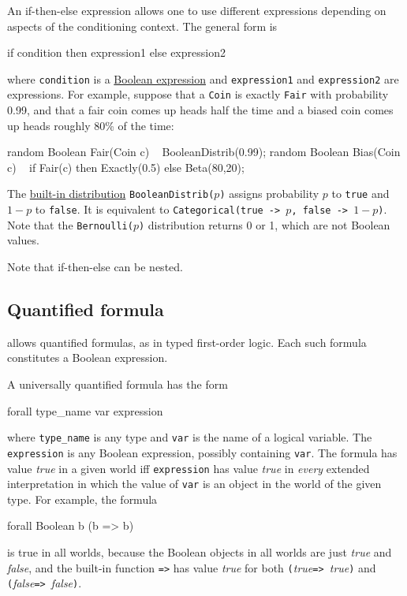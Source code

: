 \documentclass[12pt]{article}
\begin{document}
An if-then-else expression allows one to use different expressions depending on aspects of the conditioning context.
The general form is
\begin{blogcode}
if condition then expression1 else expression2
\end{blogcode}
where \texttt{condition} is a \hyperref[Boolean-expression-section]{Boolean expression} and \texttt{expression1} and \texttt{expression2}
are expressions. For example, suppose that a {\tt Coin} is exactly {\tt Fair} with probability 0.99, and that
a fair coin comes up heads half the time and a biased coin comes up heads roughly 80\% of the time:
\begin{blogcode}
random Boolean Fair(Coin c) ~ BooleanDistrib(0.99);
random Boolean Bias(Coin c) ~  
  if Fair(c) then Exactly(0.5) 
  else Beta(80,20);
\end{blogcode}
The \hyperref[builtin-distribution-appendix]{built-in distribution}
{\tt BooleanDistrib($p$)} assigns probability $p$ to {\tt true} and
$1-p$ to {\tt false}. It is equivalent to {\tt Categorical({true ->
    $p$, false -> $1-p$})}. Note that the {\tt Bernoulli($p$)}
distribution returns 0 or 1, which are not Boolean values. 

Note that if-then-else can be nested. 



\subsection{Quantified formula}\label{quantifier-section}
\bl allows quantified formulas, as in typed first-order logic. 
Each such formula constitutes a Boolean expression.

A universally quantified formula has the form
\begin{blogcode}
forall type_name var expression
\end{blogcode}
where {\tt type\_name} is any type and {\tt var} is the name of a
logical variable. The {\tt expression} is any Boolean expression,
possibly containing {\tt var}. The formula has value {\it true}
in a given world iff {\tt expression} has value {\it true}
in {\em every} extended interpretation in which the value of {\tt var} 
is an object in the world of the given type. For example, the formula
\begin{blogcode}
forall Boolean b (b => b)
\end{blogcode}
is true in all worlds, because the Boolean objects in all worlds are 
just {\it true} and {\it false}, and the built-in function {\tt =>}
has value {\it true} for both {\tt (}{\it true}{\tt => }{\it true}{\tt )}
and {\tt (}{\it false}{\tt => }{\it false}{\tt )}.
\end{document}
